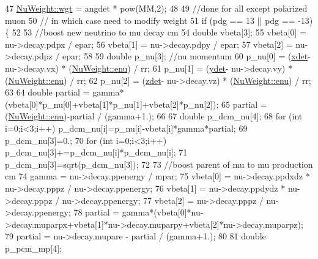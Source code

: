 \begin{DoxyCode}
47     \hyperlink{class_neutrino_flux_auxiliar_1_1_nu_weight_a53e3e4d489356d71c6493e9e4ae11250}{NuWeight::wgt}  = angdet * pow(MM,2);
48  
49     \textcolor{comment}{//done for all except polarized muon}
50     \textcolor{comment}{// in which case need to modify weight}
51     \textcolor{keywordflow}{if} (pdg == 13 || pdg == -13)\{
52 
53       \textcolor{comment}{//boost new neutrino to mu decay cm}
54       \textcolor{keywordtype}{double} vbeta[3];
55       vbeta[0] = nu->decay.pdpx / epar;
56       vbeta[1] = nu->decay.pdpy / epar;
57       vbeta[2] = nu->decay.pdpz / epar;
58 
59       \textcolor{keywordtype}{double} p\_nu[3]; \textcolor{comment}{//nu momentum    }
60       p\_nu[0] = (\hyperlink{class_neutrino_flux_auxiliar_1_1_nu_weight_a9ea8df1e61c18a5a795746c182c31a5a}{xdet}- nu->decay.vx) * (\hyperlink{class_neutrino_flux_auxiliar_1_1_nu_weight_aaf30ef23c7cf98ecbda310a777d0b8aa}{NuWeight::enu}) / rr;
61       p\_nu[1] = (\hyperlink{class_neutrino_flux_auxiliar_1_1_nu_weight_a4041206ba690070b210e5d8b28497c56}{ydet}- nu->decay.vy) * (\hyperlink{class_neutrino_flux_auxiliar_1_1_nu_weight_aaf30ef23c7cf98ecbda310a777d0b8aa}{NuWeight::enu}) / rr;
62       p\_nu[2] = (\hyperlink{class_neutrino_flux_auxiliar_1_1_nu_weight_a4e33b89875dd565737b9a35e201b4585}{zdet}- nu->decay.vz) * (\hyperlink{class_neutrino_flux_auxiliar_1_1_nu_weight_aaf30ef23c7cf98ecbda310a777d0b8aa}{NuWeight::enu}) / rr;
63 
64       \textcolor{keywordtype}{double} partial = gamma*(vbeta[0]*p\_nu[0]+vbeta[1]*p\_nu[1]+vbeta[2]*p\_nu[2]);
65       partial = (\hyperlink{class_neutrino_flux_auxiliar_1_1_nu_weight_aaf30ef23c7cf98ecbda310a777d0b8aa}{NuWeight::enu})-partial / (gamma+1.);
66 
67       \textcolor{keywordtype}{double} p\_dcm\_nu[4];
68       \textcolor{keywordflow}{for} (\textcolor{keywordtype}{int} i=0;i<3;i++) p\_dcm\_nu[i]=p\_nu[i]-vbeta[i]*gamma*partial;
69       p\_dcm\_nu[3]=0.;
70       \textcolor{keywordflow}{for} (\textcolor{keywordtype}{int} i=0;i<3;i++) p\_dcm\_nu[3]+=p\_dcm\_nu[i]*p\_dcm\_nu[i];
71       p\_dcm\_nu[3]=sqrt(p\_dcm\_nu[3]);
72 
73       \textcolor{comment}{//boost parent of mu to mu production cm}
74       gamma   = nu->decay.ppenergy / mpar;
75       vbeta[0] = nu->decay.ppdxdz * nu->decay.pppz / nu->decay.ppenergy;
76       vbeta[1] = nu->decay.ppdydz * nu->decay.pppz / nu->decay.ppenergy;
77       vbeta[2] =                    nu->decay.pppz / nu->decay.ppenergy;
78       partial = gamma*(vbeta[0]*nu->decay.muparpx+vbeta[1]*nu->decay.muparpy+vbeta[2]*nu->decay.muparpz);
79       partial = nu->decay.mupare - partial / (gamma+1.);
80 
81       \textcolor{keywordtype}{double} p\_pcm\_mp[4];

\end{DoxyCode}
